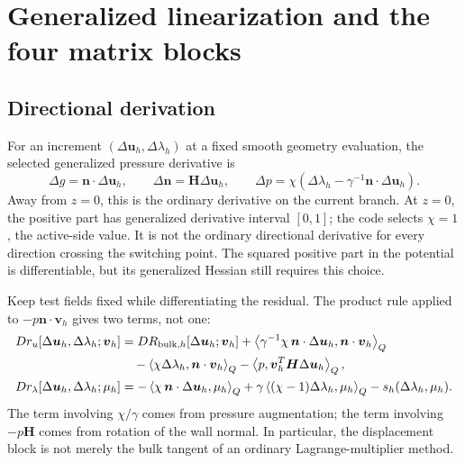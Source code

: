 \documentclass[preprint,11pt]{elsarticle}
\numberwithin{equation}{section}
\newcommand{\bu}{\boldsymbol{u}}
\newcommand{\bv}{\boldsymbol{v}}
\newcommand{\bn}{\boldsymbol{n}}
\newcommand{\bH}{\boldsymbol{H}}
\newcommand{\iq}[2]{\left\langle #1,#2\right\rangle_Q}
\begin{document}
\section{Generalized linearization and the four matrix blocks}
\label{sec:tangent}

\subsection{Directional derivation}
For an increment $(\Delta\bu_h,\Delta\lambda_h)$ at a fixed smooth
geometry evaluation, the selected generalized pressure derivative is
\begin{equation}
 \Delta g=\bn\cdot\Delta\bu_h,\qquad
 \Delta\bn=\bH\Delta\bu_h,\qquad
 \Delta p=\chi\left(\Delta\lambda_h-
                       \gamma^{-1}\bn\cdot\Delta\bu_h\right).
 \label{eq:pointderivative}
\end{equation}
Away from $z=0$, this is the ordinary derivative on the current branch.
At $z=0$, the positive part has generalized derivative interval $[0,1]$;
the code selects $\chi=1$, the active-side value. It is not the ordinary
directional derivative for every direction crossing the switching point.
The squared positive part in the potential is differentiable, but its
generalized Hessian still requires this choice.

Keep test fields fixed while differentiating the residual. The product
rule applied to $-p\bn\cdot\bv_h$ gives two terms, not one:
\begin{align}
 Dr_u[\Delta\bu_h,\Delta\lambda_h;\bv_h]
 &=D R_{\mathrm{bulk},h}[\Delta\bu_h;\bv_h]
   +\iq{\gamma^{-1}\chi\,\bn\cdot\Delta\bu_h}
        {\bn\cdot\bv_h}\notag\\
 &\quad-\iq{\chi\Delta\lambda_h}{\bn\cdot\bv_h}
   -\iq{p}{\bv_h^T\bH\Delta\bu_h},
 \label{eq:directionru}\\
 Dr_\lambda[\Delta\bu_h,\Delta\lambda_h;\mu_h]
 &=-\iq{\chi\,\bn\cdot\Delta\bu_h}{\mu_h}
    +\gamma\iq{(\chi-1)\Delta\lambda_h}{\mu_h}
    -s_h(\Delta\lambda_h,\mu_h).
 \label{eq:directionrl}
\end{align}
The term involving $\chi/\gamma$ comes from pressure augmentation; the
term involving $-p\bH$ comes from rotation of the wall normal. In
particular, the displacement block is not merely the bulk tangent of
an ordinary Lagrange-multiplier method.
\end{document}

